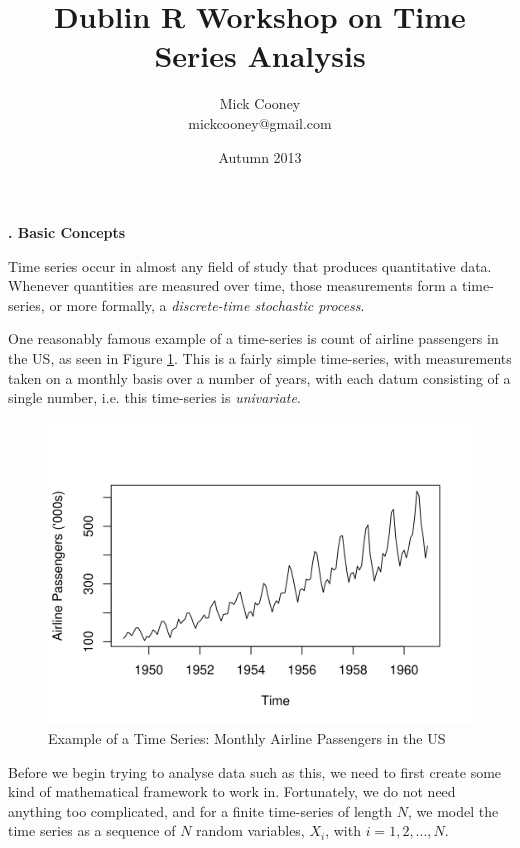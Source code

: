 \documentclass[10pt, a4paper]{article}
\title{Dublin R Workshop on Time Series Analysis}
\author{Mick Cooney\\mickcooney@gmail.com}
\date{Autumn 2013}
\newcounter{wssection}
\newcommand{\worksheetsection}[1]{
\vspace{10mm}
\stepcounter{wssection}
\noindent \Large \textbf{\thewssection. #1} \normalsize
\vspace{3mm}
}
\begin{document}
\maketitle


\worksheetsection{Basic Concepts}

\noindent
Time series occur in almost any field of study that produces
quantitative data. Whenever quantities are measured over time, those
measurements form a time-series, or more formally, a
\emph{discrete-time stochastic process}.

One reasonably famous example of a time-series is count of airline
passengers in the US, as seen in Figure \ref{fig1}. This is a fairly
simple time-series, with measurements taken on a monthly basis over a
number of years, with each datum consisting of a single number,
i.e. this time-series is \emph{univariate}.

\begin{figure}[h]
\begin{center}
\includegraphics{airline_passengers_plot.png}
\caption{\label{fig1}
Example of a Time Series: Monthly Airline Passengers in the US}
\end{center}
\end{figure}


Before we begin trying to analyse data such as this, we need to first
create some kind of mathematical framework to work in. Fortunately, we
do not need anything too complicated, and for a finite time-series of
length $N$, we model the time series as a sequence of $N$ random
variables, $X_i$, with $i = 1, 2, ..., N$.
\end{document}
